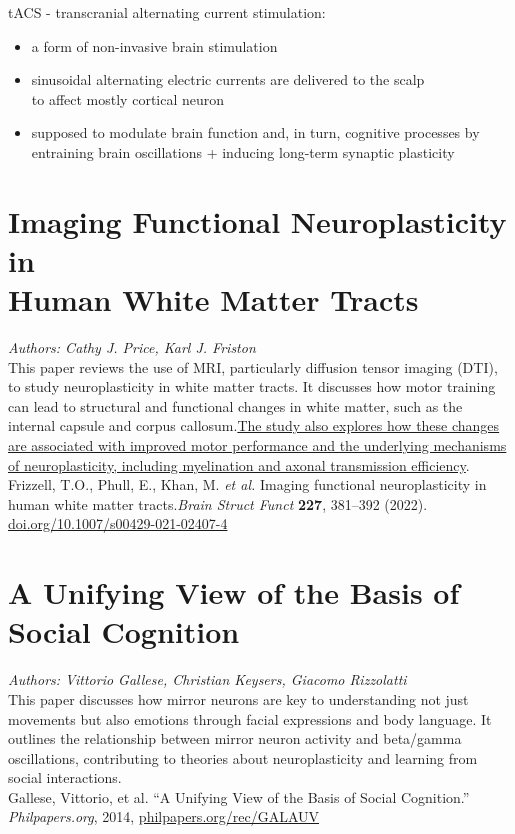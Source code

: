 \documentclass[12pt]{article}
\begin{document}
\noindent tACS - transcranial alternating current stimulation:

\begin{itemize}
    \item a form of non-invasive brain stimulation
    \item sinusoidal alternating electric currents are delivered to the scalp\\to affect mostly cortical neuron
    \item supposed to modulate brain function and, in turn, cognitive processes by entraining brain oscillations + inducing long-term synaptic plasticity
\end{itemize}

\section{Imaging Functional Neuroplasticity in\\Human White Matter Tracts}
\noindent\textit{Authors: Cathy J. Price, Karl J. Friston}\\

\noindent This paper reviews the use of MRI, particularly diffusion tensor imaging (DTI), to study neuroplasticity in white matter tracts. It discusses how motor training can lead to structural and functional changes in white matter, such as the internal capsule and corpus callosum.\href{https://www.frontiersin.org/journals/neuroscience/articles/10.3389/fnins.2024.1441002/full}{The study also explores how these changes are associated with improved motor performance and the underlying mechanisms of neuroplasticity, including myelination and axonal transmission efficiency}.\\

\noindent Frizzell, T.O., Phull, E., Khan, M. \textit{et al.} Imaging functional neuroplasticity in human white matter tracts.\textit{Brain Struct Funct} \textbf{227}, 381–392 (2022). \href{https://doi.org/10.1007/s00429-021-02407-4}{doi.org/10.1007/s00429-021-02407-4} 

\section{A Unifying View of the Basis of\\Social Cognition}

\noindent\textit{Authors: Vittorio Gallese, Christian Keysers, Giacomo Rizzolatti}\\

\noindent This paper discusses how mirror neurons are key to understanding not just movements but also emotions through facial expressions and body language. It outlines the relationship between mirror neuron activity and beta/gamma oscillations, contributing to theories about neuroplasticity and learning from social interactions.\\

\noindent Gallese, Vittorio, et al. “A Unifying View of the Basis of Social Cognition.” \textit{Philpapers.org}, 2014, \href{http://philpapers.org/rec/GALAUV}{philpapers.org/rec/GALAUV}
\end{document}
